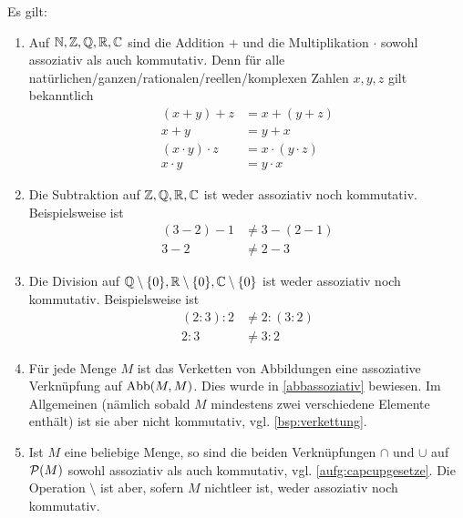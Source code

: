 \begin{bsp}
    Es gilt:
    \begin{enumerate}
        \item Auf $\mathbb N,\mathbb Z,\mathbb Q,\mathbb R,\mathbb C$ sind die Addition $+$ und die Multiplikation $\cdot$ sowohl assoziativ als auch kommutativ. Denn für alle natürlichen/ganzen/rationalen/reellen/komplexen Zahlen $x,y,z$ gilt bekanntlich
        \begin{align*}
            (x+y)+z& = x+(y+z)  \\
            x+y & = y+x \\
            (x\cdot y)\cdot z & = x\cdot (y\cdot z)  \\
            x\cdot y & = y\cdot x
        \end{align*}
        \item Die Subtraktion auf $\mathbb Z,\mathbb Q,\mathbb R,\mathbb C$ ist weder assoziativ noch kommutativ. Beispielsweise ist
        \begin{align*}
            (3-2)-1 &\neq  3-(2-1)  \\
            3-2 &\neq 2-3
        \end{align*}
        \item Die Division auf $\mathbb Q\setminus \{0\},\mathbb R\setminus \{0\},\mathbb C\setminus \{0\}$ ist weder assoziativ noch kommutativ. Beispielsweise ist
        \begin{align*}
            (2:3):2 &\neq 2:(3:2) \\
            2 : 3 & \neq 3:2
        \end{align*}
        \item Für jede Menge $M$ ist das Verketten von Abbildungen eine assoziative Verknüpfung auf $\operatorname{Abb}(M,M)$. Dies wurde in \cref{abbassoziativ} bewiesen. Im Allgemeinen (nämlich sobald $M$ mindestens zwei verschiedene Elemente enthält) ist sie aber nicht kommutativ, vgl. \cref{bsp:verkettung}.
        \item Ist $M$ eine beliebige Menge, so sind die beiden Verknüpfungen $\cap$ und $\cup$ auf $\mathcal P(M)$ sowohl assoziativ als auch kommutativ, vgl. \cref{aufg:capcupgesetze}. Die Operation $\setminus$ ist aber, sofern $M$ nichtleer ist, weder assoziativ noch kommutativ.
    \end{enumerate}
\end{bsp}


